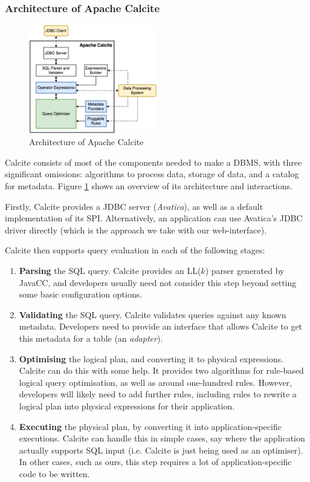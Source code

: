 \subsubsection{Architecture of Apache Calcite}

\begin{figure}
\includegraphics[width=0.5\textwidth]{design-and-implementation/calcite-architecture.png}
\centering
\caption{Architecture of Apache Calcite \cite{Begoli:2018:ACF:3183713.3190662}}
\label{fig:calcite-architecture}
\end{figure}

Calcite consists of most of the components needed to make a DBMS, with three significant omissions: algorithms to process data, storage of data, and a catalog for metadata. Figure \ref{fig:calcite-architecture} shows an overview of its architecture and interactions.

Firstly, Calcite provides a JDBC server (\emph{Avatica}), as well as a default implementation of its SPI. Alternatively, an application can use Avatica's JDBC driver directly (which is the approach we take with our web-interface).

Calcite then supports query evaluation in each of the following stages:
\begin{enumerate}
    \item \textbf{Parsing} the SQL query. Calcite provides an LL($k$) parser generated by JavaCC, and developers usually need not consider this step beyond setting some basic configuration options.
    \item \textbf{Validating} the SQL query. Calcite validates queries against any known metadata. Developers need to provide an interface that allows Calcite to get this metadata for a table (an \emph{adapter}).
    \item \textbf{Optimising} the logical plan, and converting it to physical expressions. Calcite can do this with some help. It provides two algorithms for rule-based logical query optimisation, as well as around one-hundred rules. However, developers will likely need to add further rules, including rules to rewrite a logical plan into physical expressions for their application.
    \item \textbf{Executing} the physical plan, by converting it into application-specific executions. Calcite can handle this in simple cases, say where the application actually supports SQL input (i.e. Calcite is just being used as an optimiser). In other cases, such as ours, this step requires a lot of application-specific code to be written.
\end{enumerate}

